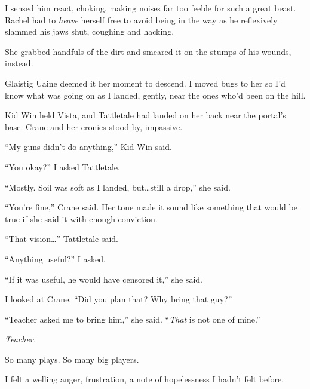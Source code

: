 I sensed him react, choking, making noises far too feeble for such a great beast.  Rachel had to \emph{heave} herself free to avoid being in the way as he reflexively slammed his jaws shut, coughing and hacking.



She grabbed handfuls of the dirt and smeared it on the stumps of his wounds, instead.



Glaistig Uaine deemed it her moment to descend.  I moved bugs to her so I'd know what was going on as I landed, gently, near the ones who'd been on the hill.



Kid Win held Vista, and Tattletale had landed on her back near the portal's base.  Crane and her cronies stood by, impassive.



``My guns didn't do anything,'' Kid Win said.



``You okay?'' I asked Tattletale.



``Mostly.  Soil was soft as I landed, but\ldots still a drop,'' she said.



``You're fine,'' Crane said.  Her tone made it sound like something that would be true if she said it with enough conviction.



``That vision\ldots''  Tattletale said.



``Anything useful?'' I asked.



``If it was useful, he would have censored it,'' she said.



I looked at Crane.  ``Did you plan that?  Why bring that guy?''



``Teacher asked me to bring him,'' she said.  ``\emph{That} is not one of mine.''



\emph{Teacher.}



So many plays.  So many big players.



I felt a welling anger, frustration, a note of hopelessness I hadn't felt before.



